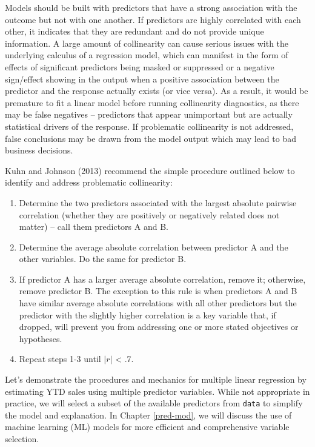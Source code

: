 \documentclass[
]{book}
\providecommand{\tightlist}{%
  \setlength{\itemsep}{0pt}\setlength{\parskip}{0pt}}
\begin{document}
Models should be built with predictors that have a strong association with the outcome but not with one another. If predictors are highly correlated with each other, it indicates that they are redundant and do not provide unique information. A large amount of collinearity can cause serious issues with the underlying calculus of a regression model, which can manifest in the form of effects of significant predictors being masked or suppressed or a negative sign/effect showing in the output when a positive association between the predictor and the response actually exists (or vice versa). As a result, it would be premature to fit a linear model before running collinearity diagnostics, as there may be false negatives -- predictors that appear unimportant but are actually statistical drivers of the response. If problematic collinearity is not addressed, false conclusions may be drawn from the model output which may lead to bad business decisions.

Kuhn and Johnson (2013) recommend the simple procedure outlined below to identify and address problematic collinearity:

\begin{enumerate}
\def\labelenumi{\arabic{enumi}.}
\tightlist
\item
  Determine the two predictors associated with the largest absolute pairwise correlation (whether they are positively or negatively related does not matter) -- call them predictors A and B.
\item
  Determine the average absolute correlation between predictor A and the other variables. Do the same for predictor B.
\item
  If predictor A has a larger average absolute correlation, remove it; otherwise, remove predictor B. The exception to this rule is when predictors A and B have similar average absolute correlations with all other predictors but the predictor with the slightly higher correlation is a key variable that, if dropped, will prevent you from addressing one or more stated objectives or hypotheses.
\item
  Repeat steps 1-3 until \(|r|\) \textless{} .7.
\end{enumerate}

Let's demonstrate the procedures and mechanics for multiple linear regression by estimating YTD sales using multiple predictor variables. While not appropriate in practice, we will select a subset of the available predictors from \texttt{data} to simplify the model and explanation. In Chapter \ref{pred-mod}, we will discuss the use of machine learning (ML) models for more efficient and comprehensive variable selection.
\end{document}
